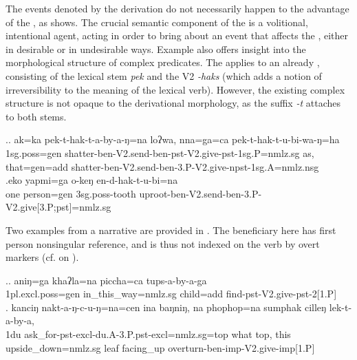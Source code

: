 The events denoted by the  derivation do not necessarily happen to the advantage of the , as \Next shows. The crucial semantic component of the  is a volitional, intentional agent, acting in order to bring about an event that affects the , either in desirable or in undesirable ways. Example \Next also offers insight into the morphological structure of complex predicates. The  applies to an already , consisting of the lexical stem \emph{pek}  and the V2 \emph{-haks}  (which adds a notion of irreversibility to the meaning of the lexical verb). However, the existing complex structure is not opaque to the derivational morphology, as the  suffix \emph{-t} attaches to both stems.

\ex.\ag. ak=ka pek-t-hak-t-a-by-a-ŋ=na loʔwa, nna=ga=ca  pek-t-hak-t-u-bi-wa-ŋ=ha\\
{\sc 1sg.poss=gen} shatter-{\sc ben-V2.send-ben-pst-V2.give-pst-1sg.P=nmlz.sg} as,   that{\sc =gen=add} shatter-{\sc ben-V2.send-ben-3.P-V2.give-npst-1sg.A=nmlz.nsg}\\
 
\bg.eko yapmi=ga o-keŋ en-d-hak-t-u-bi=na\\
one person{\sc =gen} {\sc 3sg.poss-}tooth	uproot{\sc -ben-V2.send-ben-3.P-V2.give[3.P;pst]=nmlz.sg}\\
 

Two examples from a narrative are provided in \Next. The beneficiary here has first person nonsingular reference, and is thus not indexed on the verb by overt markers (cf.  on ).

\ex.\ag. aniŋ=ga          khaʔla=na   piccha=ca    tups-a-by-a-ga\\
	{\sc 1pl.excl.poss=gen} in\_this\_way{\sc =nmlz.sg} child{\sc =add} find{\sc -pst-V2.give-pst-2[1.P]}\\
 
\bg. kanciŋ nakt-a-ŋ-c-u-ŋ=na=cen ina baŋniŋ, na phophop=na sumphak cilleŋ  lek-t-a-by-a,\\
 {\sc 1du} ask\_for{\sc -pst-excl-du.A-3.P.pst-excl=nmlz.sg=top} what  {\sc top}, this upside\_down{\sc =nmlz.sg} leaf    facing\_up overturn{\sc -ben-imp-V2.give-imp[1.P]}\\


